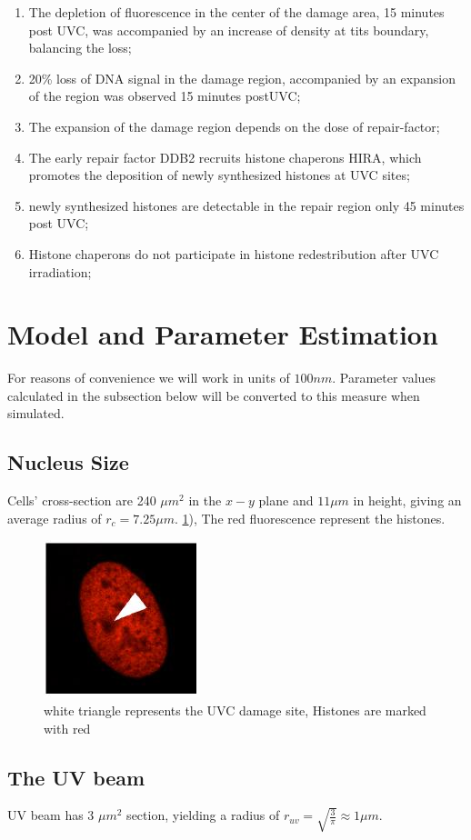 \documentclass[12pt]{report}
\begin{document}
\begin{enumerate}
		\item The depletion of fluorescence in the center of the damage area, 15 minutes post UVC, was accompanied by an increase of density at tits boundary, balancing the loss;
		\item 20\% loss of DNA signal in the damage region, accompanied by an expansion of the region was observed 15 minutes postUVC;
		\item The expansion of the damage region depends on the dose of repair-factor;		
		\item The early repair factor DDB2 recruits histone chaperons HIRA, which promotes the deposition of newly synthesized histones at UVC sites;
		\item newly synthesized histones are detectable in the repair region only 45 minutes post UVC;
		\item Histone chaperons do not participate in histone redestribution after UVC irradiation;
		
	\end{enumerate}
	
	\section{Model and Parameter Estimation}
	For reasons of convenience we will work in units of $100 nm$. Parameter values calculated in the subsection below will be converted to this measure when simulated. 
	
	\subsection{Nucleus Size}
	 Cells' cross-section are 240 $\mu m^2$ in the $x-y$ plane and $11 \mu m$ in height, giving an average radius of $r_c=7.25 \mu m$.  \ref{fig:histoneMarkBeforeDamage}), The red fluorescence represent the histones.
		\begin{figure}[H]
			\centering
			\includegraphics[width=0.2\linewidth]{../histoneMarkBeforeDamage}
			\caption{white triangle represents the UVC damage site, Histones are marked with red}
			\label{fig:histoneMarkBeforeDamage}
		\end{figure}
		
	\subsection{The UV beam}
	UV beam has 3 $\mu m^2$ section, yielding a radius of $r_{uv}=\sqrt{\frac{3}{\pi}}\approx 1 \mu m$. 
	
\end{document}

